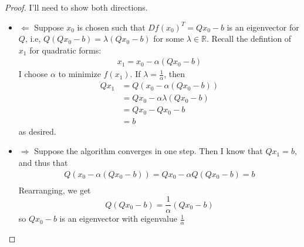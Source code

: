 \documentclass[12pt]{article}
\newenvironment{problem}[2][Problem]{\begin{trivlist}
\item[\hskip \labelsep {\bfseries #1}\hskip \labelsep {\bfseries #2.}]}{\end{trivlist}}
\theoremstyle{definition}
\theoremstyle{definition}
\theoremstyle{definition}
\theoremstyle{definition}
\begin{document}
\begin{problem}{9.4}
\begin{proof}
I'll need to show both directions.
\begin{itemize}
\item $\Leftarrow$ Suppose $x_0$ is chosen such that $Df(x_0)^T = Qx_0 - b$ is an eigenvector for $Q$, i.e, $Q(Qx_0-b) = \lambda (Qx_0-b)$ for some $\lambda \in \mathbb{R}$. Recall the defintion of $x_1$ for quadratic forms: 
\begin{align*}
x_1 = x_0 - \alpha (Qx_0 - b)
\end{align*}
I choose $\alpha$ to minimize $f(x_1)$. If $\lambda = \frac{1}{\alpha}$, then 
\begin{align*}
Qx_1 &= Q(x_0 - \alpha (Qx_0 - b)) \\ 
&= Qx_0 - \alpha\lambda(Qx_0 - b) \\
&= Qx_0 - Qx_0 - b\\
&= b
\end{align*}
as desired.
\item $\Rightarrow$
Suppose the algorithm converges in one step. Then I know that $Qx_1 = b$, and thus that 
\begin{align*}
Q (x_0 - \alpha (Qx_0 -b)) = Qx_0 - \alpha Q(Qx_0-b) = b \\
\end{align*}
Rearranging, we get 
$$Q(Qx_0-b) = \frac{1}{\alpha}(Qx_0 - b) $$
so $Qx_0-b$ is an eigenvector with eigenvalue $\frac{1}{\alpha}$ \\
\end{itemize}
\end{proof} 
\end{problem}
\end{document}
